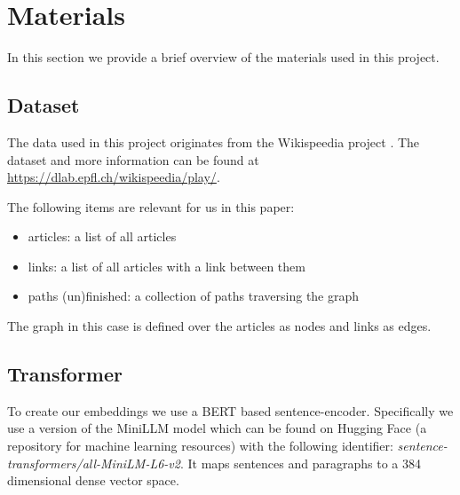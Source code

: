 \section{Materials}
\label{sec:materials}
In this section we provide a brief overview of the materials used in this project. 

\subsection{Dataset}
The data used in this project originates from the Wikispeedia project \cite{semdistances,humanwayfinding}. The dataset and more information can be found at \href{https://dlab.epfl.ch/wikispeedia/play/}{https://dlab.epfl.ch/wikispeedia/play/}.

The following items are relevant for us in this paper:
\begin{itemize}
    \item articles: a list of all articles
    \item links: a list of all articles with a link between them
    \item paths (un)finished: a collection of paths traversing the graph 
\end{itemize}

The graph in this case is defined over the articles as nodes and links as edges. 

\subsection{Transformer}
To create our embeddings we use a BERT based sentence-encoder. Specifically we use a version of the MiniLLM model\cite{gu2024minillmknowledgedistillationlarge} which can be found on Hugging Face (a repository for machine learning resources) with the following identifier: \textit{sentence-transformers/all-MiniLM-L6-v2}. It maps sentences and paragraphs to a 384 dimensional dense vector space.